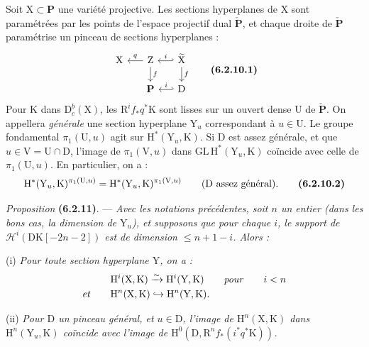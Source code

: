 \documentclass[11pt,leqno]{article}
\begin{document}
Soit \(\mathrm{X}\subset\mathbf{P}\) une variété projective. Les sections hyperplanes de \(\mathrm{X}\) sont paramétrées par les points de l’espace projectif dual \(\check{\mathbf{P}}\), et chaque droite de \(\check{\mathbf{P}}\) paramétrise un pinceau de sections hyperplanes :
\[
\begin{tikzcd}[column sep=1.5em, row sep=1.5em]
\mathrm{X}
& \mathrm{Z} \arrow[l, "q"'] \arrow[d, "f"]
& \widetilde{\mathrm{X}} \arrow[l, hook', "i"'] \arrow[d, "f"] \\
& \mathbf{P}
& \mathrm{D} \arrow[l, hook', "i"']
\end{tikzcd}
\tag*{\textbf{(6.2.10.1)}}
\]
Pour \(\mathrm{K}\) dans \(\mathrm{D}_c^b(\mathrm{X})\), les \(\mathrm{R}^if_*q^*\mathrm{K}\) sont lisses sur un ouvert dense \(\mathrm{U}\) de \(\check{\mathbf{P}}\). On appellera \textit{générale} une section hyperplane \(\mathrm{Y}_u\) correspondant à \(u\in\mathrm{U}\). Le groupe fondamental \(\pi_1(\mathrm{U},u)\) agit sur \(\mathrm{H}^*(\mathrm{Y}_u,\mathrm{K})\). Si \(\mathrm{D}\) est assez générale, et que \(u\in\mathrm{V}=\mathrm{U}\cap\mathrm{D}\), l’image de \(\pi_1(\mathrm{V},u)\) dans \(\mathrm{GL}\,\mathrm{H}^*(\mathrm{Y}_u,\mathrm{K})\) coïncide avec celle de \(\pi_1(\mathrm{U},u)\). En particulier, on a :
\[
\mathrm{H}^*(\mathrm{Y}_u,\mathrm{K})^{\pi_1(\mathrm{U},u)}
=
\mathrm{H}^*(\mathrm{Y}_u,\mathrm{K})^{\pi_1(\mathrm{V},u)}
\qquad
\text{(\(\mathrm{D}\) assez général).}
\tag*{\textbf{(6.2.10.2)}}
\]

\medskip
\textit{Proposition} \textbf{(6.2.11)}. — \textit{Avec les notations précédentes, soit \(n\) un entier (dans les bons cas, la dimension de \(\mathrm{Y}_u\)), et supposons que pour chaque \(i\), le support de \(\mathscr{H}^i(\mathrm{DK}[-2n-2])\) est de dimension \(\leq n+1-i\). Alors :}

(i) \textit{Pour toute section hyperplane \(\mathrm{Y}\), on a :}
\begin{align*}
& \mathrm{H}^i(\mathrm{X},\mathrm{K})
  \xrightarrow{\sim}
  \mathrm{H}^i(\mathrm{Y},\mathrm{K})
  \qquad \text{\textit{pour}} \qquad i<n \\
\text{\textit{et}}\qquad
& \mathrm{H}^n(\mathrm{X},\mathrm{K})
  \hookrightarrow
  \mathrm{H}^n(\mathrm{Y},\mathrm{K}).
\end{align*}

(ii) \textit{Pour \(\mathrm{D}\) un pinceau général, et \(u\in\mathrm{D}\), l’image de \(\mathrm{H}^n(\mathrm{X},\mathrm{K})\) dans \(\mathrm{H}^n(\mathrm{Y}_u,\mathrm{K})\) coïncide avec l’image de \(\mathrm{H}^0(\mathrm{D},\mathrm{R}^nf_*(i^*q^*\mathrm{K}))\).}
\end{document}
